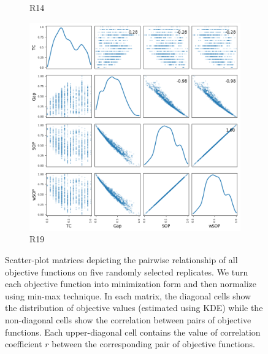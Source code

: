 \begin{figure}[!htbp]
\begin{adjustwidth}{-1cm}{-1cm}
\begin{subfigure}{0.35\textwidth}
		\caption{R14}
	\end{subfigure}
	\begin{subfigure}{0.35\textwidth}
		\includegraphics[width=\columnwidth]{Figure/NumGaps_SOP_TC_wSOP/precomputedInit/R19/fig/scatter_mattrix}
		\caption{R19}
	\end{subfigure}
	\caption{Scatter-plot matrices depicting the pairwise relationship of all objective functions on five randomly selected replicates. We turn each objective function into minimization form and then normalize using min-max technique. In each matrix, the diagonal cells show the distribution of objective values (estimated using KDE) while the non-diagonal cells show the correlation between pairs of objective functions. Each upper-diagonal cell contains the value of correlation coefficient $r$ between the corresponding pair of objective functions.}
	\label{fig:nature_obj}
	\end{adjustwidth}
\end{figure}

